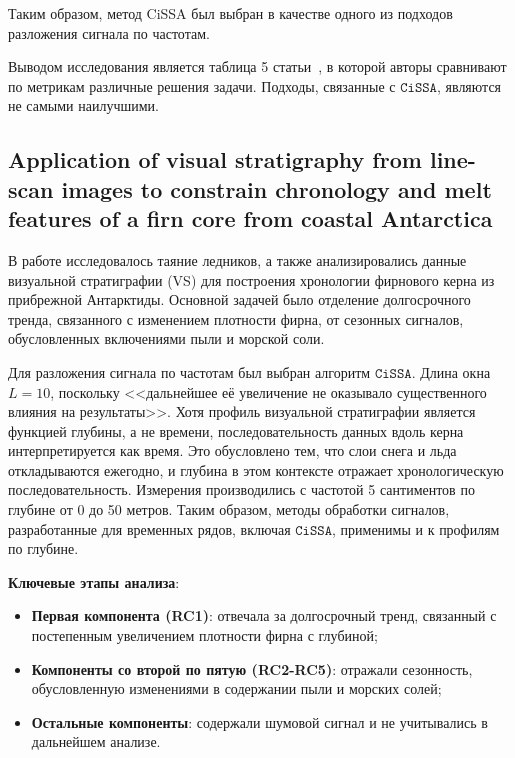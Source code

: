 \documentclass[12pt, specialist, subf
]{disser}
\theoremstyle{definition}
\newcommand{\CISSA}{\texttt{CiSSA}}
\begin{document}
Таким образом, метод CiSSA был выбран в качестве одного из подходов разложения сигнала по частотам.

Выводом исследования является таблица 5 статьи~\cite{cognitive}, в которой авторы сравнивают по метрикам различные решения задачи. Подходы, связанные с $\CISSA$, являются не самыми наилучшими.



\subsection{Application of visual stratigraphy from line-scan images to constrain chronology and melt features of a firn core from coastal Antarctica}

В работе \cite{Dey_Thamban_Laluraj_Mahalinganathan_Redkar_Kumar_Matsuoka_2023} исследовалось таяние ледников, а также анализировались данные визуальной стратиграфии (VS) для построения хронологии фирнового керна из прибрежной Антарктиды. Основной задачей было отделение долгосрочного тренда, связанного с изменением плотности фирна, от сезонных сигналов, обусловленных включениями пыли и морской соли.

Для разложения сигнала по частотам был выбран алгоритм $\CISSA$. Длина окна $L = 10$, поскольку <<дальнейшее её увеличение не оказывало существенного влияния на результаты>>. Хотя профиль визуальной стратиграфии является функцией глубины, а не времени, последовательность данных вдоль керна интерпретируется как время. Это обусловлено тем, что слои снега и льда откладываются ежегодно, и глубина в этом контексте отражает хронологическую последовательность. Измерения производились с частотой 5 сантиментов по глубине от 0 до 50 метров. Таким образом, методы обработки сигналов, разработанные для временных рядов, включая $\CISSA$, применимы и к профилям по глубине. 


\noindent \textbf{Ключевые этапы анализа}:

\begin{itemize}
	\item \textbf{Первая компонента (RC1)}: отвечала за долгосрочный тренд, связанный с постепенным увеличением плотности фирна с глубиной;
	\item \textbf{Компоненты со второй по пятую (RC2-RC5)}: отражали сезонность, обусловленную изменениями в содержании пыли и морских солей;
	\item \textbf{Остальные компоненты}: содержали шумовой сигнал и не учитывались в дальнейшем анализе.
\end{itemize}
\end{document}
